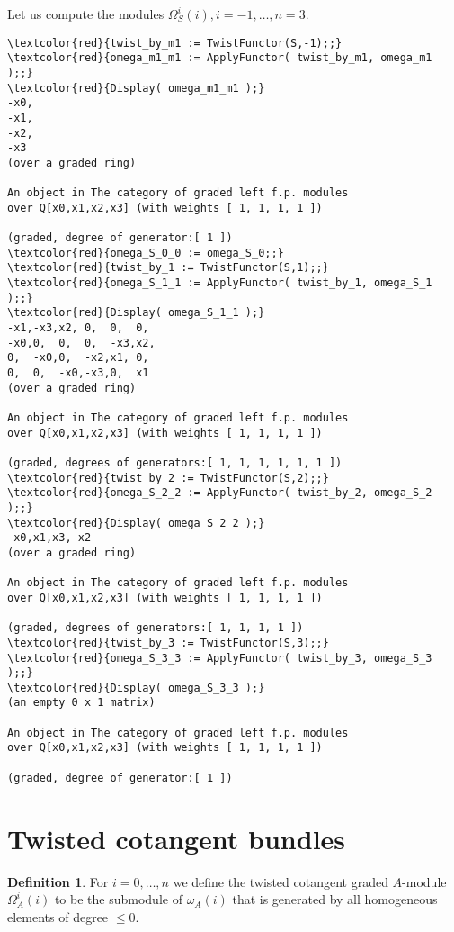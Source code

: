 \documentclass[16pt,a4paper]{extarticle}
\theoremstyle{definition}
\newtheorem{definition}{Definition}
\begin{document}
Let us compute the modules $\Omega_S^i(i), i= -1,\dots,n=3$.
\begin{Verbatim}[commandchars=\\\{\}]
\textcolor{red}{twist_by_m1 := TwistFunctor(S,-1);;}
\textcolor{red}{omega_m1_m1 := ApplyFunctor( twist_by_m1, omega_m1 );;}
\textcolor{red}{Display( omega_m1_m1 );}
-x0,
-x1,
-x2,
-x3 
(over a graded ring)

An object in The category of graded left f.p. modules
over Q[x0,x1,x2,x3] (with weights [ 1, 1, 1, 1 ])

(graded, degree of generator:[ 1 ])
\textcolor{red}{omega_S_0_0 := omega_S_0;;}
\textcolor{red}{twist_by_1 := TwistFunctor(S,1);;}
\textcolor{red}{omega_S_1_1 := ApplyFunctor( twist_by_1, omega_S_1 );;}
\textcolor{red}{Display( omega_S_1_1 );}
-x1,-x3,x2, 0,  0,  0, 
-x0,0,  0,  0,  -x3,x2,
0,  -x0,0,  -x2,x1, 0, 
0,  0,  -x0,-x3,0,  x1 
(over a graded ring)
	
An object in The category of graded left f.p. modules
over Q[x0,x1,x2,x3] (with weights [ 1, 1, 1, 1 ])
	
(graded, degrees of generators:[ 1, 1, 1, 1, 1, 1 ])
\textcolor{red}{twist_by_2 := TwistFunctor(S,2);;}
\textcolor{red}{omega_S_2_2 := ApplyFunctor( twist_by_2, omega_S_2 );;}
\textcolor{red}{Display( omega_S_2_2 );}
-x0,x1,x3,-x2
(over a graded ring)
	
An object in The category of graded left f.p. modules
over Q[x0,x1,x2,x3] (with weights [ 1, 1, 1, 1 ])
	
(graded, degrees of generators:[ 1, 1, 1, 1 ])
\textcolor{red}{twist_by_3 := TwistFunctor(S,3);;}
\textcolor{red}{omega_S_3_3 := ApplyFunctor( twist_by_3, omega_S_3 );;}
\textcolor{red}{Display( omega_S_3_3 );}
(an empty 0 x 1 matrix)
	
An object in The category of graded left f.p. modules
over Q[x0,x1,x2,x3] (with weights [ 1, 1, 1, 1 ])
	
(graded, degree of generator:[ 1 ])	
\end{Verbatim}
\section{Twisted cotangent bundles}
\begin{definition}
	For $i=0,\dots,n$ we define the twisted cotangent graded $A$-module $\Omega^i_A(i)$ to be the submodule of 
	$\omega_A(i)$ that is generated by all homogeneous elements of degree  $\leq 0$. 
\end{definition}
\end{document}
